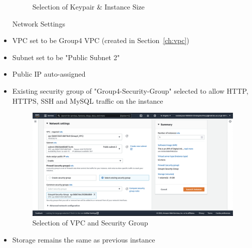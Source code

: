\begin{itemize}
\begin{figure}[H]
	      \caption{Selection of Keypair \& Instance Size}
	      \label{fig:elb-type-and-keypair}
	\end{figure}
	Network Settings
	\item VPC set to be Group4 VPC  (created in Section~\ref{ch:vpc})
	\item Subnet set to be "Public Subnet 2"
	\item Public IP auto-assigned
	\item Existing security group of "Group4-Security-Group" selected to allow HTTP, HTTPS, SSH and MySQL traffic on the
	      instance \begin{figure}[H]
	      \centering
	      \includegraphics[width=\textwidth]{resources/elb/elb-instance-2-network-settings.png}
	      \caption{Selection of VPC and Security Group}
	      \label{fig:elb-instance-2-network-setting}
	\end{figure}
	\item Storage remains the same as previous instance


\end{itemize}
